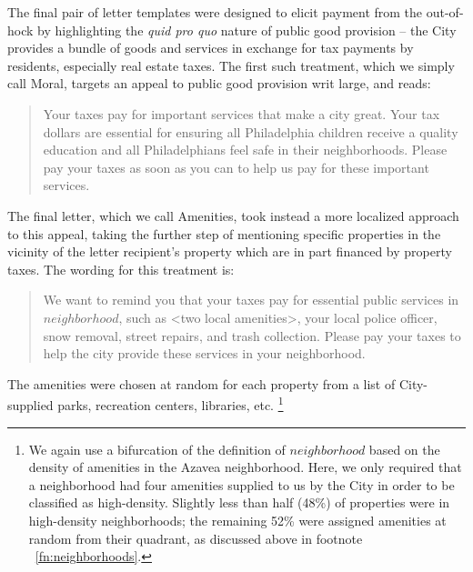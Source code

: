 \documentclass[12pt,titlepage]{article}
\begin{document}
The final pair of letter templates were designed to elicit payment from 
the out-of-hock by highlighting the \textit{quid pro quo} nature of
public good provision – the City provides a bundle of goods and services
in exchange for tax payments by residents, especially real estate taxes.
The first such treatment, which we simply call Moral, targets an appeal 
to public good provision writ large, and reads:

\blockquote{
	Your taxes pay for important services that make a city great. Your 
	tax dollars are essential for ensuring all Philadelphia children 
	receive a quality education and all Philadelphians feel safe in 
	their neighborhoods. Please pay your taxes as soon as you can 
	to help us pay for these important services. 
}

The final letter, which we call Amenities, took instead a more 
localized approach to this appeal, taking the further step of mentioning 
specific properties in the vicinity of the letter recipient's property 
which are in part financed by property taxes. The wording for this treatment is:

\blockquote{
	We want to remind you that your taxes pay for essential public services 
	in $neighborhood$, such as <two local amenities>, your local police officer, 
	snow removal, street repairs, and trash collection. Please pay your taxes 
	to help the city provide these services in your neighborhood.
}

The amenities were chosen at random for each property from a list of 
City-supplied parks, recreation centers, libraries, etc.
\footnote{
	We again use a bifurcation of the definition of $neighborhood$ based on
	the density of amenities in the Azavea neighborhood. Here, we only 
	required that a neighborhood had four amenities supplied to us by the
	City in order to be classified as high-density. Slightly less than 
	half (48\%) of properties were in high-density neighborhoods; the 
	remaining 52\% were assigned amenities at random from their quadrant, 
	as discussed above in footnote ~\ref{fn:neighborhoods}. 
}
\end{document}
